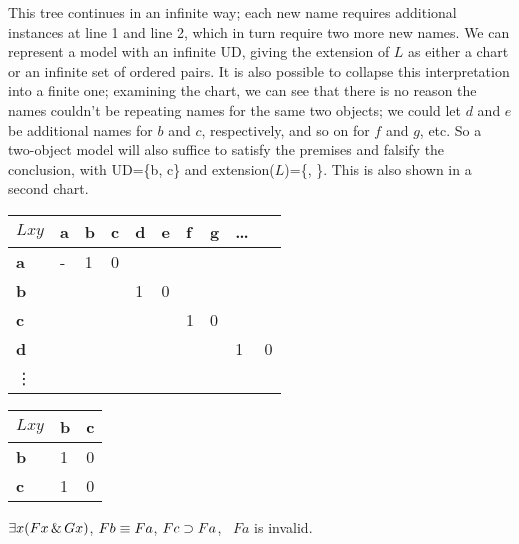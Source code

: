 \begin{earg}
This tree continues in an infinite way; each new name requires additional instances at line 1 and line 2, which in turn require two more new names. We can represent a model with an infinite UD, giving the extension of $L$ as either a chart or an infinite set of ordered pairs. It is also possible to collapse this interpretation into a finite one; examining the chart, we can see that there is no reason the names couldn't be repeating names for the same two objects; we could let $d$ and $e$ be additional names for $b$ and $c$, respectively, and so on for $f$ and $g$, etc. So a two-object model will also suffice to satisfy the premises and falsify the conclusion, with UD=\{b, c\} and extension($L$)=\{, \}. This is also shown in a second chart.

\begin{table}[h!]
\centering
\begin{tabular}{l|lllllllll}
$Lxy$        & \textbf{a} & \textbf{b} & \textbf{c} & \textbf{d} & \textbf{e} & \textbf{f} & \textbf{g} & \ldots &   \\ \hline
\textbf{a} & -          & 1          & 0          &            &            &            &            &     &   \\
\textbf{b} &            &            &            & 1          & 0          &            &            &     &   \\
\textbf{c} &            &            &            &            &            & 1          & 0          &     &   \\
\textbf{d} &            &            &            &            &            &            &            & 1   & 0 \\
\vdots        &            &            &            &            &            &            &            &     &  
\end{tabular}
\end{table}

\begin{table}[h!]
\centering
\begin{tabular}{l|ll}
$Lxy$        & \textbf{b} & \textbf{c} \\ \hline
\textbf{b} & 1          & 0          \\
\textbf{c} & 1          & 0         
\end{tabular}
\end{table}

\item  \begin{groupitems}
	$\exists x (Fx \,\&\, Gx)$, $Fb \equiv Fa$, $Fc \supset Fa$, \therefore\ $Fa$ is invalid.


\end{groupitems}
\end{earg}
